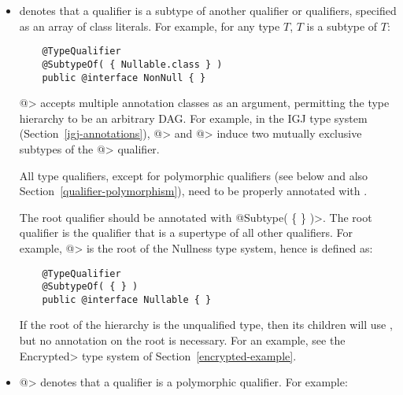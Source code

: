 \begin{itemize}

\item {} denotes that a qualifier is a subtype of
  another qualifier or qualifiers, specified as an array of class
  literals.  For example, for any type $T$,
   $T$ is a subtype of  $T$:

  \begin{Verbatim}
    @TypeQualifier
    @SubtypeOf( { Nullable.class } )
    public @interface NonNull { }
  \end{Verbatim}



  \<@> accepts multiple annotation classes as an argument,
  permitting the type hierarchy to be an arbitrary DAG\@.  For example,
  in the IGJ type system (Section~\ref{igj-annotations}), \<@>
  and \<@> induce two mutually exclusive subtypes of the
  \<@> qualifier.

  All type qualifiers, except for polymorphic qualifiers (see below and
  also Section~\ref{qualifier-polymorphism}), need to be
  properly annotated with .

  The root qualifier should be annotated with
  \<@Subtype( \{ \} )>.  The root qualifier is the qualifier that is
  a supertype of all other qualifiers.  For example, \<@>
  is the root of the Nullness type system, hence is defined as:

  \begin{Verbatim}
    @TypeQualifier
    @SubtypeOf( { } )
    public @interface Nullable { }
  \end{Verbatim}

  If the root of the hierarchy is the unqualified type, then its children
  will use , but no  annotation on the root is necessary.  For an example, see the
  \<Encrypted> type system of Section~\ref{encrypted-example}.

\item \<@> denotes that a qualifier is a
  polymorphic qualifier.  For example:


\end{itemize}
